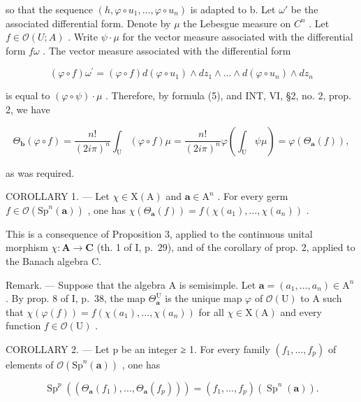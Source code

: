 so that the sequence \((h,\varphi\circ u_{1},\ldots,\varphi\circ u_{n})\) is adapted to b. Let \(\omega'\) be the associated differential form. Denote by \(\mu\) the Lebesgue measure on \(C^{n}\) . Let \(f\in\mathcal{O}(U;A)\) . Write \(\psi\cdot\mu\) for the vector measure associated with the differential form \(f\omega\) . The vector measure associated with the differential form

\[
(\varphi \circ f) \omega^ {\prime} = (\varphi \circ f) d (\varphi \circ u _ {1}) \wedge d z _ {1} \wedge \dots \wedge d (\varphi \circ u _ {n}) \wedge d z _ {n}
\]

is equal to \((\varphi \circ \psi) \cdot \mu\) . Therefore, by formula (5), and INT, VI, §2, no. 2, prop. 2, we have

\[
\Theta_ {\boldsymbol {b}} (\varphi \circ f) = \frac {n !}{(2 i \pi) ^ {n}} \int_ {\mathrm{U}} (\varphi \circ f) \mu = \frac {n !}{(2 i \pi) ^ {n}} \varphi \left(\int_ {\mathrm{U}} \psi \mu\right) = \varphi (\Theta_ {\boldsymbol {a}} (f)),
\]

as was required.

COROLLARY 1. --- Let \(\chi \in \mathrm{X}(\mathrm{A})\) and \(\boldsymbol{a} \in \mathrm{A}^n\) . For every germ \(f \in \mathcal{O}(\mathrm{Sp}^n(\boldsymbol{a}))\) , one has \(\chi(\Theta_{\boldsymbol{a}}(f)) = f(\chi(a_1), \ldots, \chi(a_n))\) .

This is a consequence of Proposition 3, applied to the continuous unital morphism \(\chi\colon\mathbf{A}\to\mathbf{C}\) (th. 1 of I, p.~29), and of the corollary of prop. 2, applied to the Banach algebra C.

Remark. --- Suppose that the algebra A is semisimple. Let \(\boldsymbol{a} = (a_{1}, \ldots, a_{n}) \in \mathrm{A}^{n}\) . By prop. 8 of I, p.~38, the map \(\Theta_{\boldsymbol{a}}^{\mathrm{U}}\) is the unique map \(\varphi\) of \(\mathcal{O}(\mathrm{U})\) to A such that \(\chi(\varphi(f)) = f(\chi(a_{1}), \ldots, \chi(a_{n}))\) for all \(\chi \in \mathrm{X}(\mathrm{A})\) and every function \(f \in \mathcal{O}(\mathrm{U})\) .

COROLLARY 2. --- Let p be an integer ≥ 1. For every family \((f_{1},\ldots,f_{p})\) of elements of \(\mathcal{O}(\mathrm{Sp}^{n}(\boldsymbol{a}))\) , one has

\[
\operatorname{Sp} ^ {p} \left(\left(\Theta_ {\boldsymbol {a}} \left(f _ {1}\right), \dots , \Theta_ {\boldsymbol {a}} \left(f _ {p}\right)\right)\right) = \left(f _ {1}, \dots , f _ {p}\right) \left(\operatorname{Sp} ^ {n} (\boldsymbol {a})\right).
\]

